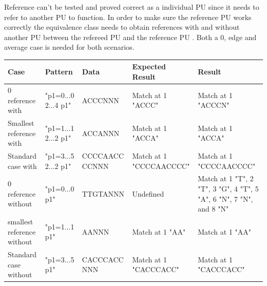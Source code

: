\documentclass[12pt]{article}
\newcommand{\pu}{PU }
\begin{document}
Reference can't be tested and proved correct as a individual \pu since it needs to refer to another \pu
to function. 
In order to make sure the reference \pu works correctly the equivalence class needs to obtain references with and
without another \pu between the refereed \pu and the reference \pu. Both a 0, edge and average case is needed for both
scenarios.
\begin{table}[H]
\begin{tabular}{p{4cm}|p{3cm}|p{2.5cm}|p{2.5cm}|p{2.5cm}}
Case 			& Pattern & Data & Expected Result & Result \\ \hline
\rowcolor{lightred}
0 reference with 	& "p1=0...0 2...4 p1" & ACCCNNN & Match at 1 "ACCC" & Match at 1 "ACCCN" \\ \hline
\rowcolor{lightgreen}
Smallest reference with 	& "p1=1...1 2...2 p1" & ACCANNN & Match at 1 "ACCA" & Match at 1 "ACCA" \\ \hline
\rowcolor{lightgreen}
Standard case with	& "p1=3...5 2...2 p1" & CCCCAACC CCNNN & Match at 1 "CCCCAACCCC" & Match at 1 "CCCCAACCCC"\\ \hline
\rowcolor{lightred}
0 reference without	& "p1=0...0 p1" & TTGTANNN & Undefined & Match at 1 "T", 2 "T", 3 "G", 4 "T", 5 "A", 6 "N", 7 "N", and 8 "N"\\ \hline
\rowcolor{lightgreen}
smallest reference without & "p1=1...1 p1" & AANNN & Match at 1 "AA" & Match at 1 "AA" \\ \hline
\rowcolor{lightgreen}
Standard case without & "p1=3...5 p1" & CACCCACC NNN & Match at 1 "CACCCACC" & Match at 1 "CACCCACC" \\ \hline
\end{tabular}
\end{table}
\end{document}

